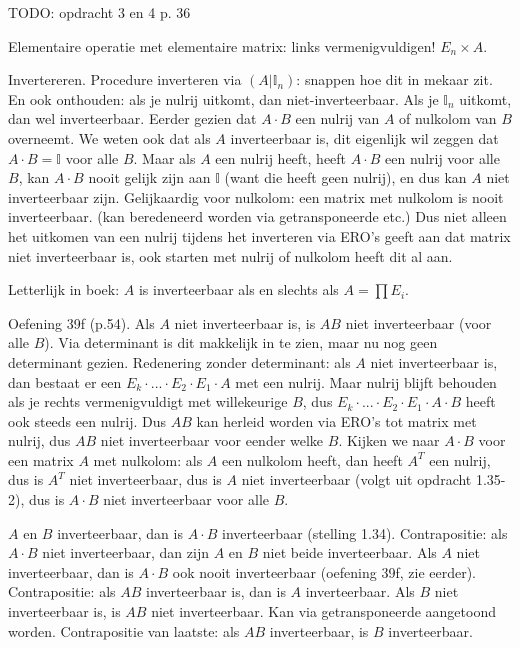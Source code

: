 \documentclass{article}
\begin{document}
TODO: opdracht 3 en 4 p. 36

Elementaire operatie met elementaire matrix: links vermenigvuldigen! $E_n \times A$. 

Invertereren. 
Procedure inverteren via $(A|\mathbb{I}_n)$: snappen hoe dit in mekaar zit. En ook onthouden: als je nulrij uitkomt, dan niet-inverteerbaar. Als je $\mathbb{I}_n$ uitkomt, dan wel inverteerbaar. 
Eerder gezien dat $A\cdot B$ een nulrij van $A$ of nulkolom van $B$ overneemt. We weten ook dat als $A$ inverteerbaar is, dit eigenlijk wil zeggen dat $A\cdot B = \mathbb{I}$ voor alle $B$. Maar als $A$ een nulrij heeft, heeft $A \cdot B$ een nulrij voor alle $B$, kan $A \cdot B$ nooit gelijk zijn aan $\mathbb{I}$ (want die heeft geen nulrij), en dus kan $A$ niet inverteerbaar zijn. Gelijkaardig voor nulkolom: een matrix met nulkolom is nooit inverteerbaar. (kan beredeneerd worden via getransponeerde etc.) 
Dus niet alleen het uitkomen van een nulrij tijdens het inverteren via ERO's geeft aan dat matrix niet inverteerbaar is, ook starten met nulrij of nulkolom heeft dit al aan. 


Letterlijk in boek: $A$ is inverteerbaar als en slechts als $A = \prod E_i$. 

Oefening 39f (p.54). Als $A$ niet inverteerbaar is, is $AB$ niet inverteerbaar (voor alle $B$). Via determinant is dit makkelijk in te zien, maar nu nog geen determinant gezien. 
Redenering zonder determinant: als $A$ niet inverteerbaar is, dan bestaat er een $E_k \cdot ... \cdot E_2 \cdot E_1 \cdot A$ met een nulrij. Maar nulrij blijft behouden als je rechts vermenigvuldigt met willekeurige $B$, dus $E_k \cdot ... \cdot E_2 \cdot E_1 \cdot A \cdot B$ heeft ook steeds een nulrij. Dus $AB$ kan herleid worden via ERO's tot matrix met nulrij, dus $AB$ niet inverteerbaar voor eender welke $B$. 
Kijken we naar $A\cdot B$ voor een matrix $A$ met nulkolom: als $A$ een nulkolom heeft, dan heeft $A^T$ een nulrij, dus is $A^T$ niet inverteerbaar, dus is $A$ niet inverteerbaar (volgt uit opdracht 1.35-2), dus is $A\cdot B$ niet inverteerbaar voor alle $B$. 

$A$ en $B$ inverteerbaar, dan is $A\cdot B$ inverteerbaar (stelling 1.34). 
Contrapositie: als $A\cdot B$ niet inverteerbaar, dan zijn $A$ en $B$ niet beide inverteerbaar. 
Als $A$ niet inverteerbaar, dan is $A\cdot B$ ook nooit inverteerbaar (oefening 39f, zie eerder). 
Contrapositie: als $AB$ inverteerbaar is, dan is $A$ inverteerbaar. Als $B$ niet inverteerbaar is, is $AB$ niet inverteerbaar. Kan via getransponeerde aangetoond worden. 
Contrapositie van laatste: als $AB$ inverteerbaar, is $B$ inverteerbaar. 
\end{document}

